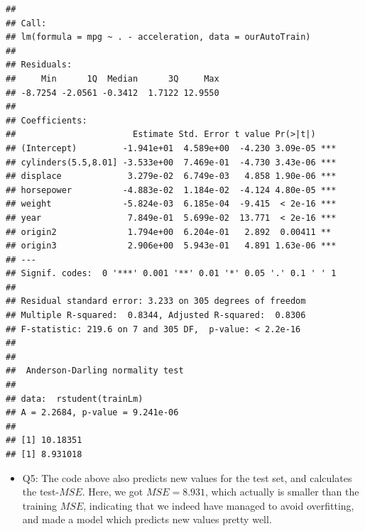 \documentclass[]{article}
\newenvironment{Shaded}{\begin{snugshade}}{\end{snugshade}}
\newcommand{\KeywordTok}[1]{\textcolor[rgb]{0.13,0.29,0.53}{\textbf{#1}}}
\newcommand{\DataTypeTok}[1]{\textcolor[rgb]{0.13,0.29,0.53}{#1}}
\newcommand{\DecValTok}[1]{\textcolor[rgb]{0.00,0.00,0.81}{#1}}
\newcommand{\OperatorTok}[1]{\textcolor[rgb]{0.81,0.36,0.00}{\textbf{#1}}}
\newcommand{\NormalTok}[1]{#1}
\providecommand{\tightlist}{%
  \setlength{\itemsep}{0pt}\setlength{\parskip}{0pt}}
\begin{document}
\begin{Shaded}
\end{Shaded}

\begin{verbatim}
## 
## Call:
## lm(formula = mpg ~ . - acceleration, data = ourAutoTrain)
## 
## Residuals:
##     Min      1Q  Median      3Q     Max 
## -8.7254 -2.0561 -0.3412  1.7122 12.9550 
## 
## Coefficients:
##                       Estimate Std. Error t value Pr(>|t|)    
## (Intercept)         -1.941e+01  4.589e+00  -4.230 3.09e-05 ***
## cylinders(5.5,8.01] -3.533e+00  7.469e-01  -4.730 3.43e-06 ***
## displace             3.279e-02  6.749e-03   4.858 1.90e-06 ***
## horsepower          -4.883e-02  1.184e-02  -4.124 4.80e-05 ***
## weight              -5.824e-03  6.185e-04  -9.415  < 2e-16 ***
## year                 7.849e-01  5.699e-02  13.771  < 2e-16 ***
## origin2              1.794e+00  6.204e-01   2.892  0.00411 ** 
## origin3              2.906e+00  5.943e-01   4.891 1.63e-06 ***
## ---
## Signif. codes:  0 '***' 0.001 '**' 0.01 '*' 0.05 '.' 0.1 ' ' 1
## 
## Residual standard error: 3.233 on 305 degrees of freedom
## Multiple R-squared:  0.8344, Adjusted R-squared:  0.8306 
## F-statistic: 219.6 on 7 and 305 DF,  p-value: < 2.2e-16
## 
## 
##  Anderson-Darling normality test
## 
## data:  rstudent(trainLm)
## A = 2.2684, p-value = 9.241e-06
## 
## [1] 10.18351
## [1] 8.931018
\end{verbatim}

\begin{itemize}
\tightlist
\item
  Q5: The code above also predicts new values for the test set, and
  calculates the test-\(MSE\). Here, we got \(MSE=8.931\), which
  actually is smaller than the training \(MSE\), indicating that we
  indeed have managed to avoid overfitting, and made a model which
  predicts new values pretty well.
\end{itemize}
\end{document}
